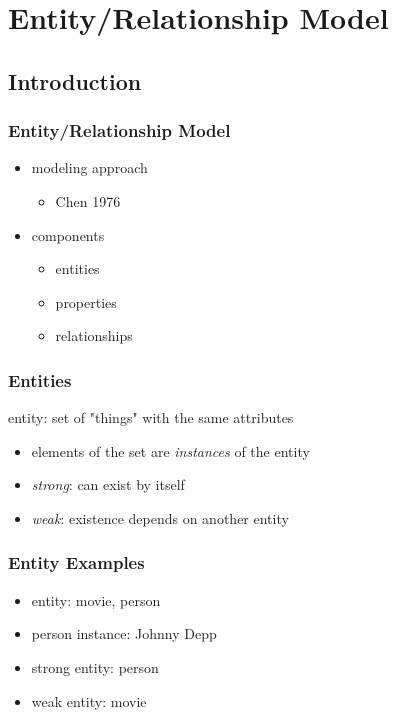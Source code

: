\documentclass[dvipsnames]{beamer}
\begin{document}
\section{Entity/Relationship Model}

\subsection{Introduction}

\begin{frame}
  \frametitle{Entity/Relationship Model}

  \begin{itemize}
    \item modeling approach
    \begin{itemize}
      \item Chen 1976
    \end{itemize}

    \pause
    \item components
    \begin{itemize}
      \item entities
      \item properties
      \item relationships
    \end{itemize}
  \end{itemize}
\end{frame}

\begin{frame}
  \frametitle{Entities}

  \begin{definition}
    \alert{entity}: set of "things" with the same attributes

    \pause
    \begin{itemize}
      \item elements of the set are \emph{instances} of the entity
    \end{itemize}

    \pause
    \begin{itemize}
      \item \emph{strong}: can exist by itself
      \item \emph{weak}: existence depends on another entity
    \end{itemize}
  \end{definition}
\end{frame}

\begin{frame}
  \frametitle{Entity Examples}

  \begin{example}
    \begin{itemize}
      \item entity: movie, person

      \pause
      \item person instance: Johnny Depp

      \pause
      \medskip
      \item strong entity: person
      \item weak entity: movie
    \end{itemize}
  \end{example}
\end{frame}
\end{document}

